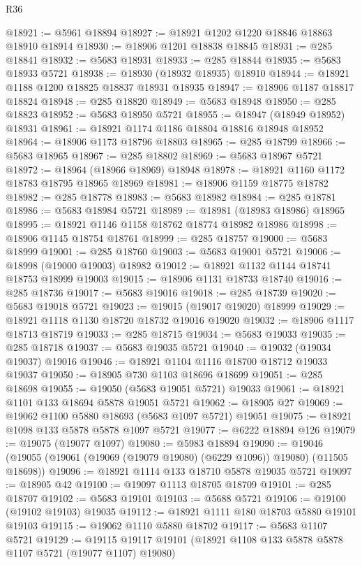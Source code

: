 \begin{lexlean}{R36}
\begin{coremodule}
@18921 := @5961 @18894
@18927 := @18921 @1202 @1220 @18846 @18863 @18910 @18914
@18930 := @18906 @1201 @18838 @18845
@18931 := @285 @18841
@18932 := @5683 @18931
@18933 := @285 @18844
@18935 := @5683 @18933 @5721
@18938 := @18930 (@18932 @18935) @18910
@18944 := @18921 @1188 @1200 @18825 @18837 @18931 @18935
@18947 := @18906 @1187 @18817 @18824
@18948 := @285 @18820
@18949 := @5683 @18948
@18950 := @285 @18823
@18952 := @5683 @18950 @5721
@18955 := @18947 (@18949 @18952) @18931
@18961 := @18921 @1174 @1186 @18804 @18816 @18948 @18952
@18964 := @18906 @1173 @18796 @18803
@18965 := @285 @18799
@18966 := @5683 @18965
@18967 := @285 @18802
@18969 := @5683 @18967 @5721
@18972 := @18964 (@18966 @18969) @18948
@18978 := @18921 @1160 @1172 @18783 @18795 @18965 @18969
@18981 := @18906 @1159 @18775 @18782
@18982 := @285 @18778
@18983 := @5683 @18982
@18984 := @285 @18781
@18986 := @5683 @18984 @5721
@18989 := @18981 (@18983 @18986) @18965
@18995 := @18921 @1146 @1158 @18762 @18774 @18982 @18986
@18998 := @18906 @1145 @18754 @18761
@18999 := @285 @18757
@19000 := @5683 @18999
@19001 := @285 @18760
@19003 := @5683 @19001 @5721
@19006 := @18998 (@19000 @19003) @18982
@19012 := @18921 @1132 @1144 @18741 @18753 @18999 @19003
@19015 := @18906 @1131 @18733 @18740
@19016 := @285 @18736
@19017 := @5683 @19016
@19018 := @285 @18739
@19020 := @5683 @19018 @5721
@19023 := @19015 (@19017 @19020) @18999
@19029 := @18921 @1118 @1130 @18720 @18732 @19016 @19020
@19032 := @18906 @1117 @18713 @18719
@19033 := @285 @18715
@19034 := @5683 @19033
@19035 := @285 @18718
@19037 := @5683 @19035 @5721
@19040 := @19032 (@19034 @19037) @19016
@19046 := @18921 @1104 @1116 @18700 @18712 @19033 @19037
@19050 := @18905 @730 @1103 @18696 @18699
@19051 := @285 @18698
@19055 := @19050 (@5683 @19051 @5721) @19033
@19061 := @18921 @1101 @133 @18694 @5878 @19051 @5721
@19062 := @18905 @27
@19069 := @19062 @1100 @5880 @18693 (@5683 @1097 @5721) @19051
@19075 := @18921 @1098 @133 @5878 @5878 @1097 @5721
@19077 := @6222 @18894 @126
@19079 := @19075 (@19077 @1097)
@19080 := @5983 @18894
@19090 := @19046 (@19055 (@19061 (@19069 (@19079 @19080) (@6229 @1096)) @19080) (@11505 @18698))
@19096 := @18921 @1114 @133 @18710 @5878 @19035 @5721
@19097 := @18905 @42
@19100 := @19097 @1113 @18705 @18709
@19101 := @285 @18707
@19102 := @5683 @19101
@19103 := @5688 @5721
@19106 := @19100 (@19102 @19103) @19035
@19112 := @18921 @1111 @180 @18703 @5880 @19101 @19103
@19115 := @19062 @1110 @5880 @18702
@19117 := @5683 @1107 @5721
@19129 := @19115 @19117 @19101 (@18921 @1108 @133 @5878 @5878 @1107 @5721 (@19077 @1107) @19080)

\end{coremodule}
\end{lexlean}
